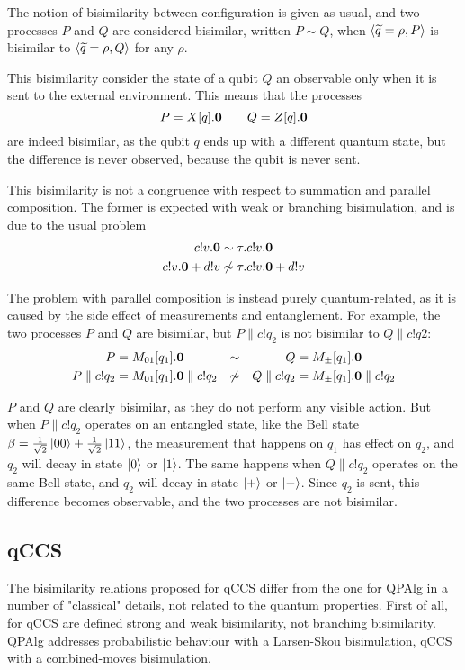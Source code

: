 The notion of bisimilarity between configuration is given as usual, and two processes $P$ and $Q$ are considered bisimilar, written $P \sim Q$, when $\langle\widetilde{q} = \rho, P\rangle$ is bisimilar to $\langle\widetilde{q} = \rho, Q\rangle$ for any $\rho$.

This bisimilarity consider the state of a qubit $Q$ an observable only when it is sent to the external environment. This means that the processes 
\[ P = X[q].\mathbf{0} \qquad Q = Z[q].\mathbf{0}\]
are indeed bisimilar, as the qubit $q$ ends up with a different quantum state, but the difference is never observed, because the qubit is never sent.

This bisimilarity is not a congruence with respect to summation and parallel composition. The former is expected with weak or branching bisimulation, and is due to the usual problem 
\begin{align*}
c!v.\mathbf{0} &\sim \tau.c!v.\mathbf{0} \\
c!v.\mathbf{0} + d!v &\not\sim \tau.c!v.\mathbf{0} + d!v
\end{align*}

The problem with parallel composition is instead purely quantum-related, as it is caused by the side effect of measurements and entanglement. For example, the two processes $P$ and $Q$ are bisimilar, but $P\parallel c!q_2$ is not bisimilar to $Q \parallel c!q2$:
\begin{align*}
 P &= M_{01}[q_1].\mathbf{0} &\sim & & Q &= M_\pm[q_1].\mathbf{0} \\ 
 P \parallel c!q_2 &=  M_{01}[q_1].\mathbf{0} \parallel c!q_2 &\not\sim & & Q \parallel c!q_2 &=  M_\pm[q_1].\mathbf{0} \parallel c!q_2 
\end{align*} 

$P$ and $Q$ are clearly bisimilar, as they do not perform any visible action. But when $P\parallel c!q_2$ operates on an entangled state, like the Bell state $\beta = \frac{1}{\sqrt{2}}\ket{00} + \frac{1}{\sqrt{2}}\ket{11}$, the measurement that happens on $q_1$ has effect on $q_2$, and $q_2$ will decay in state $\ket{0}$ or $\ket{1}$. The same happens when $Q\parallel c!q_2$ operates on the same Bell state, and $q_2$ will decay in state $\ket{+}$ or $\ket{-}$. Since $q_2$ is sent, this difference becomes observable, and the two processes are not bisimilar.

\subsection{qCCS}

The bisimilarity relations proposed for qCCS differ from the one for QPAlg in a number of "classical" details, not related to the quantum properties. First of all, for qCCS are defined strong and weak bisimilarity, not branching bisimilarity. QPAlg addresses probabilistic behaviour with a Larsen-Skou bisimulation, qCCS with a combined-moves bisimulation. 

